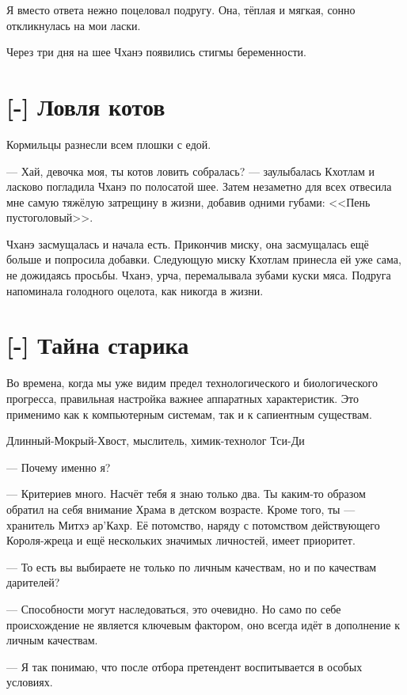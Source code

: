 Я вместо ответа нежно поцеловал подругу.
Она, тёплая и мягкая, сонно откликнулась на мои ласки.

Через три дня на шее Чханэ появились стигмы беременности.

\section{[-] Ловля котов}

\textspace

Кормильцы разнесли всем плошки с едой.

--- Хай, девочка моя, ты котов ловить собралась? --- заулыбалась Кхотлам и ласково погладила Чханэ по полосатой шее.
Затем незаметно для всех отвесила мне самую тяжёлую затрещину в жизни, добавив одними губами: <<Пень пустоголовый>>.

Чханэ засмущалась и начала есть.
Прикончив миску, она засмущалась ещё больше и попросила добавки.
Следующую миску Кхотлам принесла ей уже сама, не дожидаясь просьбы.
Чханэ, урча, перемалывала зубами куски мяса.
Подруга напоминала голодного оцелота, как никогда в жизни.

\textspace

\section{[-] Тайна старика}

\epigraph
{Во времена, когда мы уже видим предел технологического и биологического прогресса, правильная настройка важнее аппаратных характеристик.
Это применимо как к компьютерным системам, так и к сапиентным существам.}
{Длинный-Мокрый-Хвост, мыслитель, химик-технолог Тси-Ди}

\textspace

--- Почему именно я?

--- Критериев много.
Насчёт тебя я знаю только два.
Ты каким-то образом обратил на себя внимание Храма в детском возрасте.
Кроме того, ты --- хранитель Митхэ ар'Кахр.
Её потомство, наряду с потомством действующего Короля-жреца и ещё нескольких значимых личностей, имеет приоритет.

--- То есть вы выбираете не только по личным качествам, но и по качествам дарителей?

--- Способности могут наследоваться, это очевидно.
Но само по себе происхождение не является ключевым фактором, оно всегда идёт в дополнение к личным качествам.

--- Я так понимаю, что после отбора претендент воспитывается в особых условиях.

